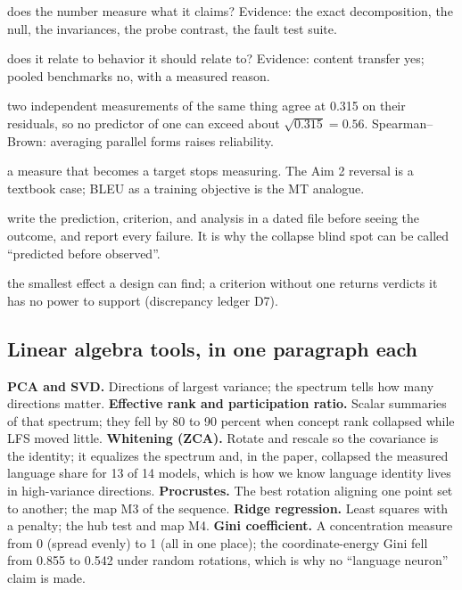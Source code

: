 \begin{description}[leftmargin=3.4cm, style=nextline, itemsep=1pt]
\item[construct validity] does the number measure what it claims? Evidence: the exact decomposition, the null, the invariances, the probe contrast, the fault test suite.
\item[predictive validity] does it relate to behavior it should relate to? Evidence: content transfer yes; pooled benchmarks no, with a measured reason.
\item[reliability and ceilings] two independent measurements of the same thing agree at 0.315 on their residuals, so no predictor of one can exceed about $\sqrt{0.315} = 0.56$. Spearman--Brown: averaging parallel forms raises reliability.
\item[Goodhart's law] a measure that becomes a target stops measuring. The Aim 2 reversal is a textbook case; BLEU as a training objective is the MT analogue.
\item[preregistration] write the prediction, criterion, and analysis in a dated file before seeing the outcome, and report every failure. It is why the collapse blind spot can be called ``predicted before observed''.
\item[minimum detectable effect] the smallest effect a design can find; a criterion without one returns verdicts it has no power to support (discrepancy ledger D7).
\end{description}

\subsection{Linear algebra tools, in one paragraph each}

\textbf{PCA and SVD.} Directions of largest variance; the spectrum tells how
many directions matter. \textbf{Effective rank and participation ratio.}
Scalar summaries of that spectrum; they fell by 80 to 90 percent when concept
rank collapsed while LFS moved little. \textbf{Whitening (ZCA).} Rotate
and rescale so the covariance is the identity; it equalizes the spectrum and,
in the paper, collapsed the measured language share for 13 of 14 models,
which is how we know language identity lives in high-variance directions.
\textbf{Procrustes.} The best rotation aligning one point set to another;
the map M3 of the sequence. \textbf{Ridge regression.} Least squares with a
penalty; the hub test and map M4. \textbf{Gini coefficient.} A
concentration measure from 0 (spread evenly) to 1 (all in one place); the
coordinate-energy Gini fell from 0.855 to 0.542 under random rotations,
which is why no ``language neuron'' claim is made.
